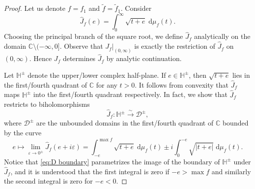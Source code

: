 \documentclass[11pt,letterpaper,oneside]{amsart}
\newcommand{\C}{\mathbb{C}}
\renewcommand{\epsilon}{\varepsilon}
\theoremstyle{definition}
\theoremstyle{remark}
\newcommand{\wt}{\widetilde}
\newcommand{\wh}{\widehat}
\theoremstyle{definition}
\theoremstyle{remark}
\newcommand{\CD}{\mathcal{D}}
\newcommand{\dif}{\mathrm{d}}
\begin{document}
\begin{proof}
\medskip

	Let us denote $f = f_1$ and $\wt f = \wt f_1$. Consider
	\begin{equation*}
		\wh J_{f}(e) = \int_0^\infty \sqrt{t + e} \; \dif \mu_f(t).
	\end{equation*}
	Choosing the principal branch of the square root, we define $\wh J_f$ analytically on the domain $\C \setminus (-\infty, 0]$.
	Observe that $J_f|_{(0, \infty)}$ is exactly the restriction of $\wh J_f$ on $(0, \infty)$.
	Hence $J_f$ determines $\wh J_f$  by analytic continuation.

\medskip

	Let $\mathbb{H}^\pm$ denote the upper/lower complex half-plane. 
	If $e \in \mathbb{H}^\pm$, then $\sqrt{t + e}$ lies in the first/fourth quadrant of $\C$ for any $t > 0$. It follows from convexity that $\wh J_f$ maps $\mathbb{H}^\pm$ into the first/fourth quadrant respectively.
	In fact, we show that $\wh J_f$ restricts to biholomorphisms
	\begin{equation}\label{eq:hat J bihol}
		\wh J_f: \mathbb{H}^\pm \xrightarrow{\sim} \CD^\pm,
	\end{equation}
	where $\CD^\pm$ are the unbounded domains in the first/fourth quadrant of $\C$ bounded by the curve 
	\begin{equation}\label{eq:D boundary}
		e \mapsto \lim_{\epsilon \to 0^\pm}\wh J_f (e + i \epsilon) = \int_{-e}^{\max f} \sqrt{t + e} \; \dif \mu_f(t) \pm i \int_{0}^{-e} \sqrt{|t + e|}\; \dif \mu_f(t).
	\end{equation}
	Notice that \eqref{eq:D boundary} parametrizes the image of the boundary of $\mathbb{H}^\pm$ under $\wh J_f$, and it is understood that the first integral is zero if $-e > \max f$ and similarly the second integral is zero for $-e < 0$.

\medskip


\end{proof}
\end{document}
